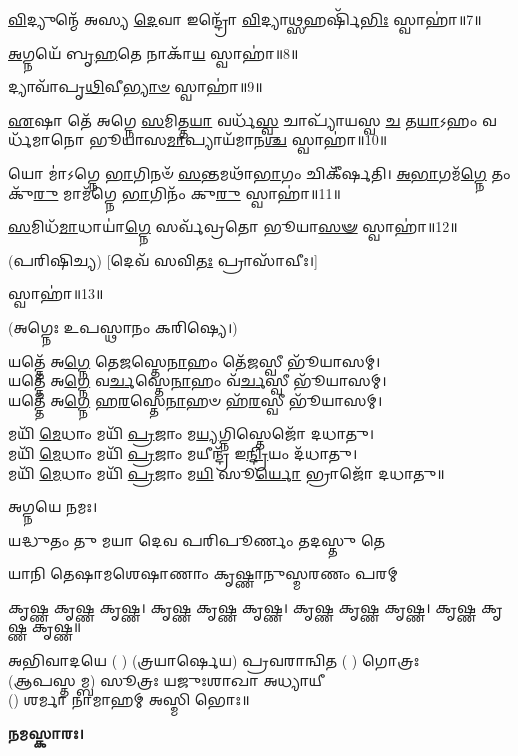 \-\ul{𑌵𑌿}\-𑌦𑍍𑌯𑍁𑌨𑍍𑌮𑍇᳴ 𑌅𑌸𑍍𑌯 \ul{𑌦𑍇}\-𑌵𑌾 𑌇𑌨𑍍𑌦𑍍𑌰𑍋᳴ \ul{𑌵𑌿}\-𑌦𑍍𑌯𑌾\-\ul{𑌥𑍍𑌸}\-𑌹𑌰𑍍\mbox{}𑌷𑌿᳴\-\ul{𑌭𑌿𑌃} 𑌸𑍍𑌵𑌾𑌹𑌾॑॥7॥

\-\ul{𑌅}\-𑌗𑍍𑌨𑌯𑍇᳴ 𑌬𑍃\-\ul{𑌹}\-𑌤𑍇 𑌨𑌾𑌕𑌾᳴\-\ul{𑌯} 𑌸𑍍𑌵𑌾𑌹𑌾॑॥8॥

𑌦𑍍𑌯𑌾𑌵𑌾᳴𑌪𑍃\-\ul{𑌥𑌿}\-𑌵𑍀\-\ul{𑌭𑍍𑌯𑌾}\-\-\ul{𑍞} 𑌸𑍍𑌵𑌾𑌹𑌾॑॥9॥

\-\ul{𑌏}\-𑌷𑌾 𑌤𑍇᳴ 𑌅𑌗𑍍𑌨𑍇 \ul{𑌸}\-𑌮𑌿𑌤𑍍𑌤\-\ul{𑌯𑌾} 𑌵𑌰𑍍𑌧᳴\-\ul{𑌸𑍍𑌵} 𑌚𑌾𑌪𑍍𑌯𑌾᳴𑌯𑌸𑍍𑌵 \ul{𑌚} 𑌤\-\ul{𑌯𑌾}\-𑌽𑌹𑌂 𑌵𑌰𑍍𑌧᳴𑌮𑌾𑌨𑍋 𑌭𑍂𑌯𑌾𑌸\-\ul{𑌮𑌾}\-𑌪𑍍𑌯𑌾𑌯᳴𑌮𑌾𑌨\-\ul{𑌶𑍍𑌚} 𑌸𑍍𑌵𑌾𑌹𑌾॑॥10॥

𑌯𑍋 𑌮𑌾॑𑌽𑌗𑍍𑌨𑍇 \ul{𑌭𑌾}\-𑌗𑌿𑌨𑍞᳴ \ul{𑌸}\-𑌨𑍍𑌤𑌮𑌥𑌾᳴\-\ul{𑌭𑌾}\-𑌗𑌂 𑌚𑌿𑌕𑍀᳴𑌰𑍍\mbox{}𑌷𑌤𑌿। \ul{𑌅}\-\-\ul{𑌭𑌾}\-𑌗𑌮᳴\-\ul{𑌗𑍍𑌨𑍇} 𑌤𑌂 𑌕𑍁᳴\-\ul{𑌰𑍁} 𑌮𑌾𑌮᳴𑌗𑍍𑌨𑍇 \ul{𑌭𑌾}\-𑌗𑌿𑌨𑌂᳴ 𑌕𑍁\-\ul{𑌰𑍁} 𑌸𑍍𑌵𑌾𑌹𑌾॑॥11॥

\-\ul{𑌸}\-𑌮𑌿𑌧᳴\-\ul{𑌮𑌾}\-𑌧𑌾𑌯𑌾॑\-\ul{𑌗𑍍𑌨𑍇} 𑌸𑌰𑍍𑌵᳴𑌵𑍍𑌰𑌤𑍋 𑌭𑍂𑌯𑌾\-\ul{𑌸}\-\-\ul{𑍟} 𑌸𑍍𑌵𑌾𑌹𑌾॑॥12॥

(𑌪𑌰𑌿𑌷𑌿𑌚𑍍𑌯) [𑌦𑍇𑌵᳴ 𑌸𑌵𑌿\-\ul{𑌤𑌃} 𑌪𑍍𑌰𑌾𑌸𑌾᳴𑌵𑍀𑌃।]

𑌸𑍍𑌵𑌾𑌹𑌾॑॥13॥


(𑌅𑌗𑍍𑌨𑍇𑌃 𑌉𑌪𑌸𑍍𑌥𑌾𑌨𑌂 𑌕𑌰𑌿𑌷𑍍𑌯𑍇।)

𑌯𑌤𑍍𑌤𑍇᳴ 𑌅\-\ul{𑌗𑍍𑌨𑍇} 𑌤𑍇\-\ul{𑌜}\-𑌸𑍍𑌤𑍇\-\ul{𑌨𑌾}\-𑌹𑌂 𑌤𑍇᳴\-\ul{𑌜}\-𑌸𑍍𑌵𑍀 𑌭𑍂᳴𑌯𑌾𑌸𑌮𑍍।\\
𑌯𑌤𑍍𑌤𑍇᳴ 𑌅\-\ul{𑌗𑍍𑌨𑍇} 𑌵\-\ul{𑌰𑍍𑌚}\-𑌸𑍍𑌤𑍇\-\ul{𑌨𑌾}\-𑌹𑌂 𑌵᳴\-\ul{𑌰𑍍𑌚}\-𑌸𑍍𑌵𑍀 𑌭𑍂᳴𑌯𑌾𑌸𑌮𑍍।\\
𑌯𑌤𑍍𑌤𑍇᳴ 𑌅\-\ul{𑌗𑍍𑌨𑍇} 𑌹\-\ul{𑌰}\-𑌸𑍍𑌤𑍇\-\ul{𑌨𑌾}\-𑌹𑍞 𑌹᳴\-\ul{𑌰}\-𑌸𑍍𑌵𑍀 𑌭𑍂᳴𑌯𑌾𑌸𑌮𑍍।

𑌮𑌯𑌿᳴ \ul{𑌮𑍇}\-𑌧𑌾𑌂 𑌮𑌯𑌿᳴ \ul{𑌪𑍍𑌰}\-𑌜𑌾𑌂 𑌮\-\ul{𑌯𑍍𑌯}\-𑌗𑍍𑌨𑌿𑌸𑍍𑌤𑍇𑌜𑍋᳴ 𑌦𑌧𑌾𑌤𑍁।\\
𑌮𑌯𑌿᳴ \ul{𑌮𑍇}\-𑌧𑌾𑌂 𑌮𑌯𑌿᳴ \ul{𑌪𑍍𑌰}\-𑌜𑌾𑌂 𑌮𑌯𑍀𑌨𑍍𑌦𑍍𑌰᳴ 𑌇\-\ul{𑌨𑍍𑌦𑍍𑌰𑌿}\-𑌯𑌂 𑌦᳴𑌧𑌾𑌤𑍁।\\
𑌮𑌯𑌿᳴ \ul{𑌮𑍇}\-𑌧𑌾𑌂 𑌮𑌯𑌿᳴ \ul{𑌪𑍍𑌰}\-𑌜𑌾𑌂 𑌮\-\ul{𑌯𑌿} 𑌸𑍂\-\ul{𑌰𑍍𑌯𑍋} 𑌭𑍍𑌰𑌾𑌜𑍋᳴ 𑌦𑌧𑌾𑌤𑍁॥
 
𑌅𑌗𑍍𑌨𑌯𑍇 𑌨𑌮𑌃। 

{𑌯𑌦𑍍𑌧𑍁𑌤𑌂 𑌤𑍁 𑌮𑌯𑌾 𑌦𑍇𑌵 𑌪𑌰𑌿𑌪𑍂𑌰𑍍𑌣𑌂 𑌤𑌦𑌸𑍍𑌤𑍁 𑌤𑍇}

{𑌯𑌾𑌨𑌿 𑌤𑍇𑌷𑌾𑌮𑌶𑍇𑌷𑌾𑌣𑌾𑌂 𑌕𑍃𑌷𑍍𑌣𑌾𑌨𑍁𑌸𑍍𑌮𑌰𑌣𑌂 𑌪𑌰𑌮𑍍}

𑌕𑍃𑌷𑍍𑌣 𑌕𑍃𑌷𑍍𑌣 𑌕𑍃𑌷𑍍𑌣। 𑌕𑍃𑌷𑍍𑌣 𑌕𑍃𑌷𑍍𑌣 𑌕𑍃𑌷𑍍𑌣। 𑌕𑍃𑌷𑍍𑌣 𑌕𑍃𑌷𑍍𑌣 𑌕𑍃𑌷𑍍𑌣। 𑌕𑍃𑌷𑍍𑌣 𑌕𑍃𑌷𑍍𑌣 𑌕𑍃𑌷𑍍𑌣॥

𑌅𑌭𑌿𑌵𑌾𑌦𑌯𑍇 ( ) (𑌤𑍍𑌰𑌯𑌾𑌰𑍍𑌷𑍇𑌯) 𑌪𑍍𑌰𑌵𑌰𑌾𑌨𑍍𑌵𑌿𑌤 ( ) 𑌗𑍋𑌤𑍍𑌰𑌃\\
(𑌆𑌪𑌸𑍍𑌤𑌮𑍍𑌬) 𑌸𑍂𑌤𑍍𑌰𑌃 𑌯𑌜𑍁𑌃𑌶𑌾𑌖𑌾 𑌅𑌧𑍍𑌯𑌾𑌯𑍀\\
() 𑌶𑌰𑍍𑌮𑌾 𑌨𑌾𑌮𑌾𑌹𑌮𑍍 𑌅𑌸𑍍𑌮𑌿 𑌭𑍋𑌃॥

\textbf{𑌨𑌮𑌸𑍍𑌕𑌾𑌰𑌃।}



